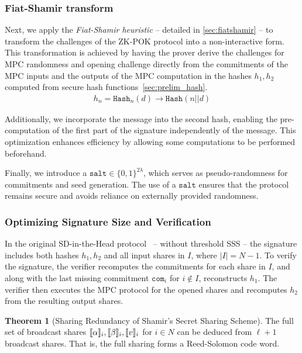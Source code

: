 \documentclass[11pt]{report}
\theoremstyle{definition}
\newtheorem{theorem}{Theorem}[section]
\theoremstyle{plain}
\begin{document}
\subsubsection{Fiat-Shamir transform}
Next, we apply the \textit{Fiat-Shamir heuristic} -- detailed in \autoref{sec:fiatshamir} -- to transform the challenges of the ZK-POK protocol into a non-interactive form. This transformation is achieved by having the prover derive the challenges for MPC randomness and opening challenge directly from the commitments of the MPC inputs and the outputs of the MPC computation in the hashes $h_1, h_2$ computed from secure hash functions~\autoref{sec:prelim_hash}.
\begin{align}
  h_n = \texttt{Hash}_n(d) \rightarrow \texttt{Hash}(n || d)\label{eq:fiatshamirhash}
\end{align}

Additionally, we incorporate the message into the second hash, enabling the pre-computation of the first part of the signature independently of the message. This optimization enhances efficiency by allowing some computations to be performed beforehand.

Finally, we introduce a $\texttt{salt} \in \{0,1\}^{2\lambda}$, which serves as pseudo-randomness for commitments and seed generation. The use of a $\texttt{salt}$ ensures that the protocol remains secure and avoids reliance on externally provided randomness.

\subsubsection{Optimizing Signature Size and Verification}
In the original SD-in-the-Head protocol~\cite[Figure 1]{aguilarsyndrome11} -- without threshold SSS -- the signature includes both hashes $h_1, h_2$ and all input shares in $I$, where $|I| = N - 1$.
To verify the signature, the verifier recomputes the commitments for each share in $I$, and along with the last missing commitment $\texttt{com}_i$ for $i \notin I$, reconstructs $h_1$. The verifier then executes the MPC protocol for the opened shares and recomputes $h_2$ from the resulting output shares.

\begin{theorem}[Sharing Redundancy of Shamir's Secret Sharing Scheme]
  The full set of broadcast shares $\llbracket \alpha \rrbracket_i, \llbracket \beta \rrbracket_i, \llbracket v \rrbracket_i$ for $i \in N$ can be deduced from $\ell + 1$ broadcast shares. That is, the full sharing forms a Reed-Solomon code word.
\end{theorem}
\end{document}
